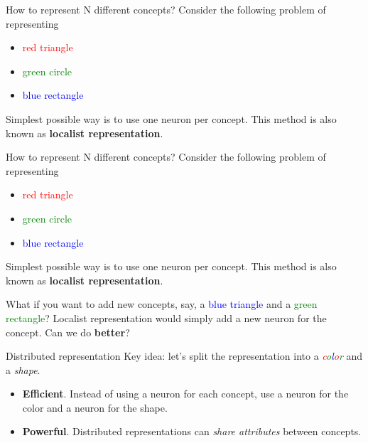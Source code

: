 \begin{frame}{How to represent N different concepts?}
Consider the following problem of representing 
\begin{itemize} 
  \item \textcolor{red}{red triangle} 
  \item \textcolor{green}{green circle} 
  \item \textcolor{blue}{blue rectangle}
\end{itemize} \newline

Simplest possible way is to use one neuron per concept. This method is also known as \textbf{localist representation}. \newline
\end{frame}

\begin{frame}{How to represent N different concepts?}
Consider the following problem of representing 
\begin{itemize} 
  \item \textcolor{red}{red triangle} 
  \item \textcolor{green}{green circle} 
  \item \textcolor{blue}{blue rectangle}
\end{itemize} \newline

Simplest possible way is to use one neuron per concept. This method is also known as \textbf{localist representation}. \newline

What if you want to add new concepts, say, a \textcolor{blue}{blue triangle} and a \textcolor{green}{green rectangle}? Localist representation would simply add a new neuron for the concept. Can we do \textbf{better}?
\end{frame}

\begin{frame}{Distributed representation}
Key idea: let's split the representation into a \textit{\textcolor{red}{c}\textcolor{green}{o}\textcolor{blue}{l}\textcolor{red}{o}\textcolor{green}{r}} and a \textit{shape}. \newline

\begin{itemize}
	\item \textbf{Efficient}. Instead of using a neuron for each concept, use a neuron for the color and a neuron for the shape. 
	\item \textbf{Powerful}. Distributed representations can \textit{share attributes} between concepts. 
\end{itemize}
\end{frame}

